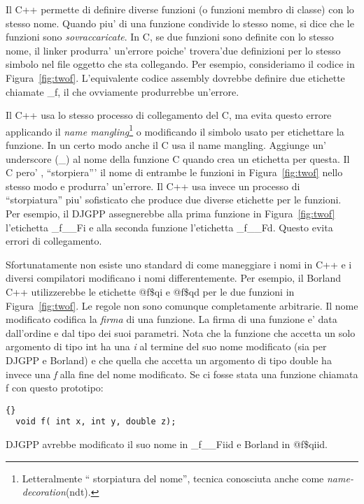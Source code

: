 Il C++ permette di definire diverse funzioni (o funzioni membro di classe)
con lo stesso nome. Quando piu' di una funzione condivide lo stesso nome,
si dice che le funzioni sono \emph{sovraccaricate}. In C, se due funzioni 
sono definite con lo stesso nome, il linker produrra' un'errore poiche'
trovera'due definizioni per lo stesso simbolo nel file oggetto che sta
collegando. Per esempio, consideriamo il codice in Figura~\ref{fig:twof}.
L'equivalente codice assembly dovrebbe definire due etichette chiamate
{\code \_f}, il che ovviamente produrrebbe un'errore. 

Il C++ usa lo stesso processo di collegamento del C, ma evita questo 
errore applicando il \emph{name mangling}\footnote{Letteralmente ``
storpiatura del nome'', tecnica conosciuta anche come \emph{name-decoration}(ndt).}
o modificando il simbolo usato per etichettare la funzione. In un 
certo modo anche il C usa il name mangling. Aggiunge un' underscore
(\_) al nome della funzione C quando crea un etichetta per questa.
Il C pero' , ``storpiera''' il nome di entrambe le funzioni in 
Figura~\ref{fig:twof} nello stesso modo e produrra' un'errore. Il C++
usa invece un processo di ``storpiatura'' piu' sofisticato che produce
due diverse etichette per le funzioni. Per esempio, il DJGPP assegnerebbe
alla prima funzione in Figura~\ref{fig:twof} l'etichetta {\code \_f\_\_Fi} e
alla seconda funzione l'etichetta {\code \_f\_\_Fd}. Questo evita
errori di collegamento.

Sfortunatamente non esiste uno standard di come  maneggiare i nomi in C++
e i diversi compilatori modificano i nomi differentemente. Per esempio,
il Borland C++ utilizzerebbe le etichette {\code @f\$qi} e {\code @f\$qd}
per le due funzioni in Figura~\ref{fig:twof}. Le regole non sono comunque
completamente arbitrarie. Il nome modificato codifica la \emph{firma} di
una funzione. La firma di una funzione e' data dall'ordine e dal tipo dei
suoi parametri. Nota che la funzione che accetta un solo argomento di tipo 
{\code int} ha una \emph{i} al termine del suo nome modificato (sia per 
DJGPP e Borland) e che quella che accetta un argomento di tipo {\code double}
ha invece una \emph{f} alla fine del nome modificato. Se ci fosse stata
una funzione chiamata {\code f} con questo prototipo:
\begin{lstlisting}[stepnumber=0]{}
  void f( int x, int y, double z);
\end{lstlisting}
\noindent DJGPP avrebbe modificato il suo nome in {\code \_f\_\_Fiid} e
Borland in {\code @f\$qiid}.

